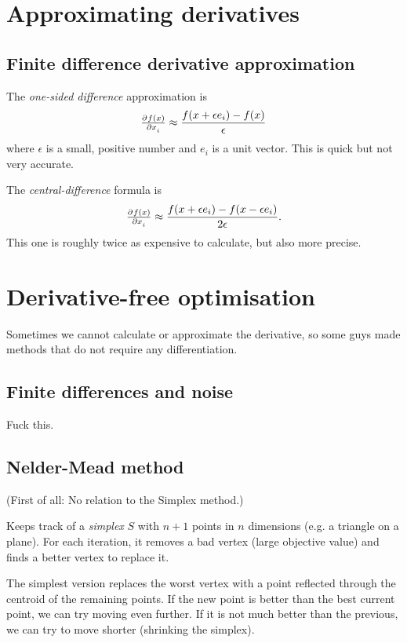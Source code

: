 \documentclass[a4paper, 12pt]{article}
\theoremstyle{definition}
\begin{document}
\section{Approximating derivatives}
\subsection{Finite difference derivative approximation}
The \emph{one-sided difference} approximation is
\begin{equation}
	\pd{f(x)}{x_i} \approx \frac{f(x + \epsilon e_i) - f(x)}{\epsilon}
\end{equation}
where \(\epsilon\) is a small, positive number and \(e_i\) is a unit vector. This is quick but not very accurate.

The \emph{central-difference} formula is
\begin{equation}
	\pd{f(x)}{x_i} \approx \frac{f(x + \epsilon e_i) - f(x - \epsilon e_i)}{2 \epsilon}
	.
\end{equation}
This one is roughly twice as expensive to calculate, but also more precise.

\section{Derivative-free optimisation}
Sometimes we cannot calculate or approximate the derivative, so some guys made methods that do not require any differentiation.

\subsection{Finite differences and noise}
Fuck this.

\subsection{Nelder-Mead method}
(First of all: No relation to the Simplex method.)

Keeps track of a \emph{simplex} \(S\) with \(n+1\) points in \(n\) dimensions (e.g. a triangle on a plane). For each iteration, it removes a bad vertex (large objective value) and finds a better vertex to replace it.

The simplest version replaces the worst vertex with a point reflected through the centroid of the remaining points. If the new point is better than the best current point, we can try moving even further. If it is not much better than the previous, we can try to move shorter (shrinking the simplex).
\end{document}

